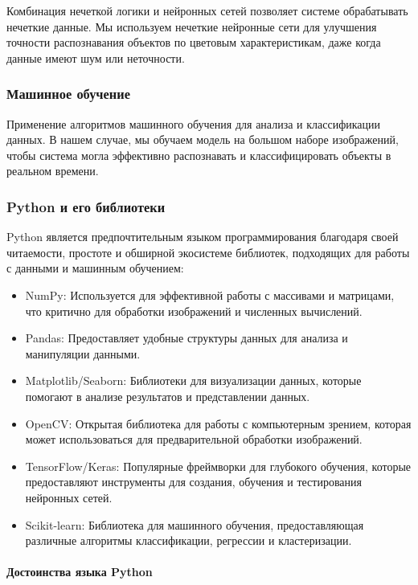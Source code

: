 Комбинация нечеткой логики и нейронных сетей позволяет системе обрабатывать нечеткие данные. Мы используем нечеткие нейронные сети для улучшения точности распознавания объектов по цветовым характеристикам, даже когда данные имеют шум или неточности.

\subsubsection{Машинное обучение}

Применение алгоритмов машинного обучения для анализа и классификации данных. В нашем случае, мы обучаем модель на большом наборе изображений, чтобы система могла эффективно распознавать и классифицировать объекты в реальном времени.

\subsubsection{Python и его библиотеки}

Python является предпочтительным языком программирования благодаря своей читаемости, простоте и обширной экосистеме библиотек, подходящих для работы с данными и машинным обучением:

\begin{itemize}
\item NumPy: Используется для эффективной работы с массивами и матрицами, что критично для обработки изображений и численных вычислений.
\item Pandas: Предоставляет удобные структуры данных для анализа и манипуляции данными.
\item Matplotlib/Seaborn: Библиотеки для визуализации данных, которые помогают в анализе результатов и представлении данных.
\item OpenCV: Открытая библиотека для работы с компьютерным зрением, которая может использоваться для предварительной обработки изображений.
\item TensorFlow/Keras: Популярные фреймворки для глубокого обучения, которые предоставляют инструменты для создания, обучения и тестирования нейронных сетей.
\item Scikit-learn: Библиотека для машинного обучения, предоставляющая различные алгоритмы классификации, регрессии и кластеризации.
\end{itemize}

\paragraph{Достоинства языка Python}

